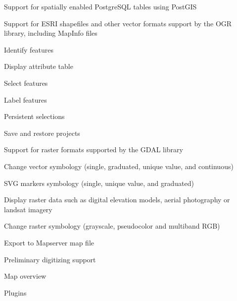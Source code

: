 \begin{compactenum}
\item Support for spatially enabled PostgreSQL tables using PostGIS 
\item Support for ESRI shapefiles and other vector formats support by the
OGR library, including MapInfo files 
\item Identify features 
\item Display attribute table 
\item Select features 
\item Label features
\item Persistent selections 
\item Save and restore projects
\item Support for raster formats supported by the GDAL library 
\item Change vector symbology (single, graduated, unique value, and continuous) 
\item SVG markers symbology (single, unique value, and graduated) 
\item Display raster data such as digital elevation models, aerial photography
or landsat imagery 
\item Change raster symbology (grayscale, pseudocolor and multiband RGB) 
\item Export to Mapserver map file 
\item Preliminary digitizing support
\item Map overview
\item Plugins 
\end{compactenum}



